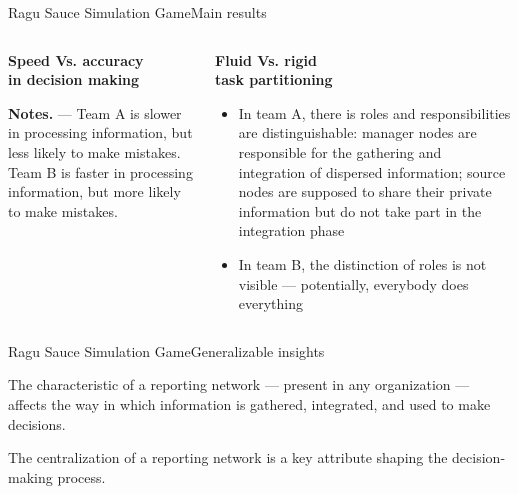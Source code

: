 \documentclass[show notes, aspectratio=1610]{beamer}
\begin{document}
\begin{frame}{Ragu Sauce Simulation Game}{Main results}
	\begin{columns}[t]
		\begin{column}{0.5\textwidth}
			\begin{center}
				\textbf{Speed Vs. accuracy \\in decision making}

				

			\end{center}

			\scriptsize \textbf{Notes.} --- Team A is slower in 
			processing information, but less likely to make mistakes. 
			Team B is faster in processing information, but more 
			likely to make mistakes.
		\end{column}
		\begin{column}{0.5\textwidth}
			\begin{center}
				\textbf{Fluid Vs. rigid \\task partitioning}

				\begin{itemize}
					\item In team A, there is roles and 
					responsibilities are distinguishable:
					manager nodes are responsible for the 
					gathering and integration of dispersed 
					information; source nodes are 
					supposed to share their private information 
					but do not take part in the integration phase
					\item In team B, the distinction of roles 
					is not visible --- potentially, everybody 
					does everything
				\end{itemize}
			\end{center}
		\end{column}
	\end{columns}
\end{frame}

\begin{frame}{Ragu Sauce Simulation Game}{Generalizable insights}
	\begin{tcolorbox}[
		colback=tri_1!5!white,
		colframe=tri_1!90!black,
		title={\centering \small Proposition 3}]
		The characteristic of a reporting network --- present in any 
		organization --- affects the way in which information is 
		gathered, integrated, and used to make decisions.
	\end{tcolorbox}

	\pause

	\begin{tcolorbox}[
		colback=tri_2!5!white,
		colframe=tri_2!90!black,
		title={\centering \small Corollario to Proposition 3}]
		The centralization of a reporting network is a key attribute 
		shaping the decision-making process.
	\end{tcolorbox}
\end{frame}
\end{document}
